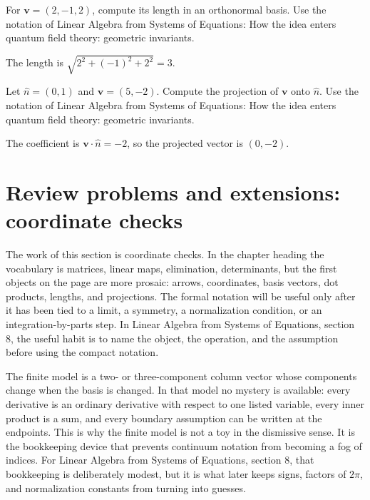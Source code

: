 \begin{exercise}
For \(\bm v=(2,-1,2)\), compute its length in an orthonormal basis.  Use the notation of Linear Algebra from Systems of Equations: How the idea enters quantum field theory: geometric invariants.
\begin{answer}
The length is \(\sqrt{2^2+(-1)^2+2^2}=3\).
\end{answer}
\end{exercise}

\begin{exercise}
Let \(\hat n=(0,1)\) and \(\bm v=(5,-2)\).  Compute the projection of \(\bm v\) onto \(\hat n\).  Use the notation of Linear Algebra from Systems of Equations: How the idea enters quantum field theory: geometric invariants.
\begin{answer}
The coefficient is \(\bm v\cdot\hat n=-2\), so the projected vector is \((0,-2)\).
\end{answer}
\end{exercise}



\section{Review problems and extensions: coordinate checks}

The work of this section is coordinate checks.  In the chapter heading the vocabulary is matrices, linear maps, elimination, determinants, but the first objects on the page are more prosaic: arrows, coordinates, basis vectors, dot products, lengths, and projections.  The formal notation will be useful only after it has been tied to a limit, a symmetry, a normalization condition, or an integration-by-parts step.  In Linear Algebra from Systems of Equations, section 8, the useful habit is to name the object, the operation, and the assumption before using the compact notation.

The finite model is a two- or three-component column vector whose components change when the basis is changed.  In that model no mystery is available: every derivative is an ordinary derivative with respect to one listed variable, every inner product is a sum, and every boundary assumption can be written at the endpoints.  This is why the finite model is not a toy in the dismissive sense.  It is the bookkeeping device that prevents continuum notation from becoming a fog of indices.  For Linear Algebra from Systems of Equations, section 8, that bookkeeping is deliberately modest, but it is what later keeps signs, factors of \(2\pi\), and normalization constants from turning into guesses.

